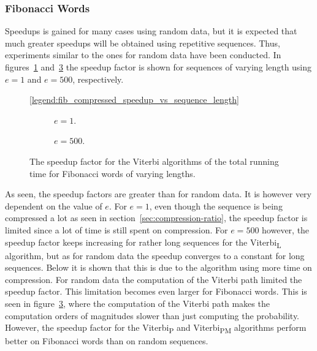 \subsubsection{Fibonacci Words}

Speedups is gained for many cases using random data, but it is
expected that much greater speedups will be obtained using repetitive
sequences. Thus, experiments similar to the ones for random data have been
conducted. In figures~\ref{fig:fib_compressed_1_speedup_vs_sequence_length}
and~\ref{fig:fib_compressed_500_speedup_vs_sequence_length} the speedup factor
is shown for sequences of varying length using $e = 1$ and $e = 500$,
respectively.

\begin{figure}
  \centering\ref{legend:fib_compressed_speedup_vs_sequence_length}\\
  \begin{subfigure}[b]{0.5\textwidth}
    \centering 
    \caption{$e = 1$.}
    \label{fig:fib_compressed_1_speedup_vs_sequence_length}
  \end{subfigure}\hspace{-5mm}%
  \begin{subfigure}[b]{0.5\textwidth}
    \centering
    
    \caption{$e = 500$.}
    \label{fig:fib_compressed_500_speedup_vs_sequence_length}
  \end{subfigure}
  \caption{The speedup factor for the Viterbi algorithms of
      the total running time for Fibonacci words of varying lengths.}
\end{figure}

As seen, the speedup factors are greater than for random data. It is however
very dependent on the value of $e$. For $e = 1$, even though the sequence is
being compressed a lot as seen in section~\ref{sec:compression-ratio}, the
speedup factor is limited since a lot of time is still spent on compression.
For $e = 500$ however, the speedup factor keeps increasing for rather long
sequences for the Viterbi\textsubscript{L} algorithm, but as for random data
the speedup converges to a constant for long sequences. Below it is shown that
this is due to the algorithm using more time on compression. For random data
the computation of the Viterbi path limited the speedup factor. This limitation
becomes even larger for Fibonacci words. This is seen in
figure~\ref{fig:fib_compressed_500_speedup_vs_sequence_length}, where the
computation of the Viterbi path makes the computation orders of magnitudes
slower than just computing the probability. However, the speedup factor for the
Viterbi\textsubscript{P} and Viterbi\textsubscript{PM} algorithms perform
better on Fibonacci words than on random sequences.

